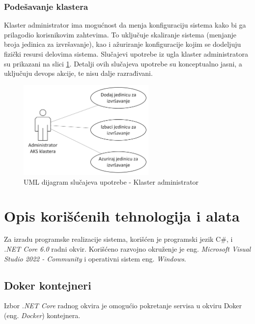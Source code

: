 \documentclass[12pt,oneside]{memoir}
\begin{document}
\subsection{Podešavanje klastera}
Klaster administrator ima mogućnost da menja konfiguraciju sistema kako bi ga prilagodio korisnikovim zahtevima. To uključuje skaliranje sistema (menjanje broja jedinica za izvršavanje), kao i ažuriranje konfiguracije kojim se dodeljuju fizički resursi delovima sistema.
Slučajevi upotrebe iz ugla klaster administratora su prikazani na slici \ref{fig:slucajupotrebe_admin_klastera}. Detalji ovih slučajeva upotrebe su konceptualno jasni, a uključuju devops akcije, te nisu dalje razrađivani.

\begin{figure}[!ht]
  \centering
  \label{fig:slucajupotrebe_admin_klastera}
  \includegraphics[width=0.6\textwidth]{./images/dijagram_slucajeva_upotrebe_administrator_klastera.png}
  \caption{UML dijagram slučajeva upotrebe - Klaster administrator}
\end{figure}

\chapter{Opis korišćenih tehnologija i alata}
\label{chp:opistehialata}

Za izradu programske realizacije sistema, korišćen je programski jezik C\#, i \emph{.NET Core 6.0} radni okvir. Korišćeno razvojno okruženje je eng. \emph{Microsoft Visual Studio 2022 - Community} i operativni sistem eng. \emph{Windows}.


\section{Doker kontejneri}
Izbor \emph{.NET Core} radnog okvira je omogućio pokretanje servisa u okviru Doker (eng. \emph{Docker}) kontejnera. 
\end{document}
